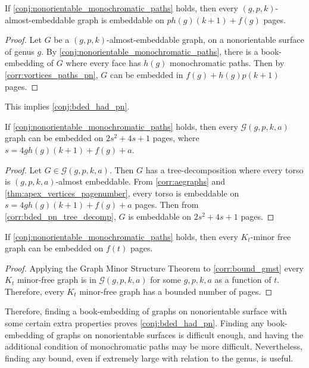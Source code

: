 \begin{corollary}\label{corr:aegraphs}
	If \cref{conj:nonorientable_monochromatic_paths} holds, then every $(g, p, k)$-almost-embeddable graph is embeddable on $p h(g) (k + 1) + f(g)$ pages.
\end{corollary}

\begin{proof}
	Let $G$ be a $(g, p, k)$-almost-embeddable graph, on a nonorientable surface of genus $g$. By \cref{conj:nonorientable_monochromatic_paths}, there is a book-embedding of $G$ where every face has $h(g)$ monochromatic paths. Then by \cref{corr:vortices_paths_pn}, $G$ can be embedded in $f(g) + h(g) p (k+1)$ pages. 
\end{proof}

This implies \cref{conj:bded_had_pn}.
\begin{corollary}\label{corr:bound_gmst}
	If \cref{conj:nonorientable_monochromatic_paths} holds, then every $\mathcal{G}(g, p, k, a)$ graph can be embedded on $2s^2 + 4s + 1$ pages, where $s =  4g h(g) (k + 1) + f(g) + a$. 
\end{corollary}

\begin{proof}
	Let $G \in \mathcal{G}(g, p, k, a)$. Then $G$ has a tree-decomposition where every torso is $(g, p, k, a)$-almost embeddable. From \cref{corr:aegraphs} and \cref{thm:apex_vertices_pagenumber}, every torso is embeddable on $s = 4g h(g) (k + 1) + f(g) + a$ pages. Then from \cref{corr:bded_pn_tree_decomp}, $G$ is embeddable on $2s^2 + 4s + 1$ pages.
\end{proof}

\begin{corollary}
	If \cref{conj:nonorientable_monochromatic_paths} holds, then every $K_t$-minor free graph can be embedded on $f(t)$ pages. 
\end{corollary}

\begin{proof}
	Applying the Graph Minor Structure Theorem to \cref{corr:bound_gmst} every $K_t$ minor-free graph is in $\mathcal{G}(g, p, k, a)$ for some $g, p, k, a$ as a function of $t$. Therefore, every $K_t$ minor-free graph has a bounded number of pages. 
\end{proof}

Therefore, finding a book-embedding of graphs on nonorientable surface with some certain extra properties proves \cref{conj:bded_had_pn}. Finding any book-embedding of graphs on nonorientable surfaces is difficult enough, and having the additional condition of monochromatic paths may be more difficult. Nevertheless, finding any bound, even if extremely large with relation to the genus, is useful. 